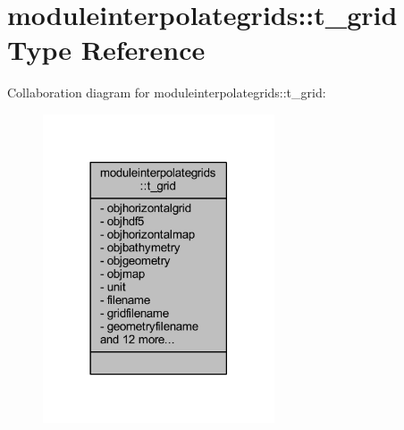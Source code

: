 \hypertarget{structmoduleinterpolategrids_1_1t__grid}{}\section{moduleinterpolategrids\+:\+:t\+\_\+grid Type Reference}
\label{structmoduleinterpolategrids_1_1t__grid}


Collaboration diagram for moduleinterpolategrids\+:\+:t\+\_\+grid\+:\nopagebreak
\begin{figure}[H]
\begin{center}
\leavevmode
\includegraphics[width=194pt]{structmoduleinterpolategrids_1_1t__grid__coll__graph}
\end{center}
\end{figure}
